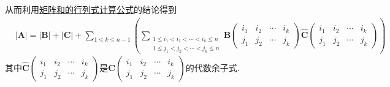 \documentclass[../../main.tex]{subfiles}%
\begin{document}
\begin{solution}
\begin{enumerate}[(1)]
从而利用\hyperref[proposition:矩阵和的行列式计算公式]{矩阵和的行列式计算公式}的结论得到
\begin{align}\label{eq(行列式):1.5式}
&|\boldsymbol{A}| = |\boldsymbol{B}| + |\boldsymbol{C}| + \sum_{1\leqslant k\leqslant n - 1}\left(\sum_{\begin{array}{c}
1\leqslant i_1 < i_2 < \cdots < i_k\leqslant n\\
1\leqslant j_1 < j_2 < \cdots < j_k\leqslant n
\end{array}}\boldsymbol{B}\left(\begin{matrix}
i_1 & i_2 & \cdots & i_k\\
j_1 & j_2 & \cdots & j_k
\end{matrix}\right)\widehat{\boldsymbol{C}}\left(\begin{matrix}
i_1 & i_2 & \cdots & i_k\\
j_1 & j_2 & \cdots & j_k
\end{matrix}\right)\right)
\end{align}
其中\(\widehat{\boldsymbol{C}}\left(\begin{matrix}
i_1 & i_2 & \cdots & i_k\\
j_1 & j_2 & \cdots & j_k
\end{matrix}\right)\)是\(\boldsymbol{C}\left(\begin{matrix}
i_1 & i_2 & \cdots & i_k\\
j_1 & j_2 & \cdots & j_k
\end{matrix}\right)\)的代数余子式.


\end{enumerate}
\end{solution}
\end{document}
